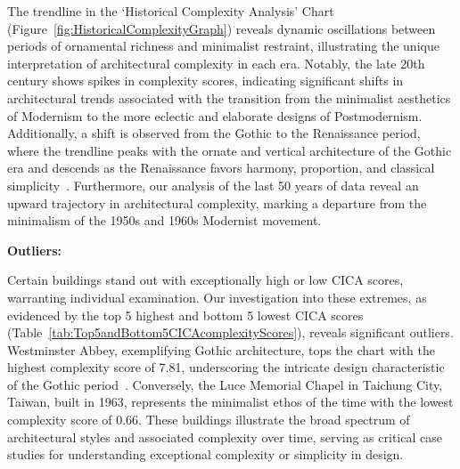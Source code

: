 The trendline in the `Historical Complexity Analysis' Chart (Figure~\ref{fig:HistoricalComplexityGraph}) reveals dynamic oscillations between periods of ornamental richness and minimalist restraint, illustrating the unique interpretation of architectural complexity in each era.
Notably, the late 20th century shows spikes in complexity scores, indicating significant shifts in architectural trends associated with the transition from the minimalist aesthetics of Modernism to the more eclectic and elaborate designs of Postmodernism.
Additionally, a shift is observed from the Gothic to the Renaissance period, where the trendline peaks with the ornate and vertical architecture of the Gothic era and descends as the Renaissance favors harmony, proportion, and classical simplicity~\cite{Stacbond2020}.
Furthermore, our analysis of the last 50 years of data reveal an upward trajectory in architectural complexity, marking a departure from the minimalism of the 1950s and 1960s Modernist movement.

\textbf{Outliers:}

Certain buildings stand out with exceptionally high or low CICA scores, warranting individual examination.
Our investigation into these extremes, as evidenced by the top 5 highest and bottom 5 lowest CICA scores (Table~\ref{tab:Top5andBottom5CICAcomplexityScores}), reveals significant outliers.
Westminster Abbey, exemplifying Gothic architecture, tops the chart with the highest complexity score of 7.81, underscoring the intricate design characteristic of the Gothic period~\cite{Stacbond2020}.
Conversely, the Luce Memorial Chapel in Taichung City, Taiwan, built in 1963, represents the minimalist ethos of the time with the lowest complexity score of 0.66.
These buildings illustrate the broad spectrum of architectural styles and associated complexity over time, serving as critical case studies for understanding exceptional complexity or simplicity in design.




